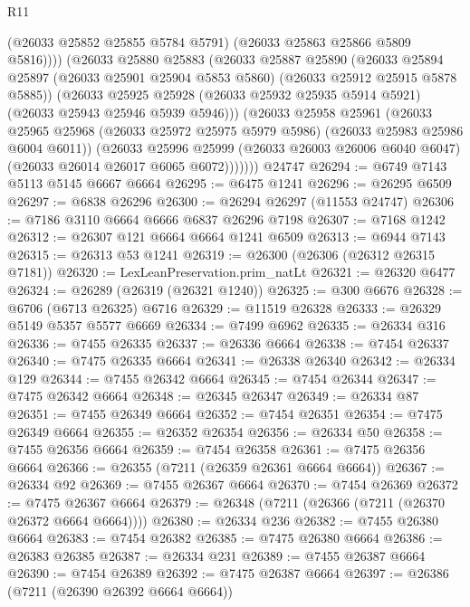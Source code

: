 \begin{lexlean}{R11}
\begin{coremodule}
{{{{{{{{{{{{{{{{{{{{{{{{{{{{{{{{{{{{{{{{{{{{{{{{{{{{{{{{{{{{{{{{{{{{{{{{{{{{{{{{{{                (@26033 @25852 @25855 @5784 @5791)
                (@26033 @25863 @25866 @5809 @5816))))
          (@26033
            @25880
            @25883
            (@26033
              @25887
              @25890
              (@26033
                @25894
                @25897
                (@26033 @25901 @25904 @5853 @5860)
                (@26033 @25912 @25915 @5878 @5885))
              (@26033
                @25925
                @25928
                (@26033 @25932 @25935 @5914 @5921)
                (@26033 @25943 @25946 @5939 @5946)))
            (@26033
              @25958
              @25961
              (@26033
                @25965
                @25968
                (@26033 @25972 @25975 @5979 @5986)
                (@26033 @25983 @25986 @6004 @6011))
              (@26033
                @25996
                @25999
                (@26033 @26003 @26006 @6040 @6047)
                (@26033 @26014 @26017 @6065 @6072)))))))
    @24747
@26294 := @6749 @7143 @5113 @5145 @6667 @6664
@26295 := @6475 @1241
@26296 := @26295 @6509
@26297 := @6838 @26296
@26300 := @26294 @26297 (@11553 @24747)
@26306 := @7186 @3110 @6664 @6666 @6837 @26296 @7198
@26307 := @7168 @1242
@26312 := @26307 @121 @6664 @6664 @1241 @6509
@26313 := @6944 @7143
@26315 := @26313 @53 @1241
@26319 := @26300 (@26306 (@26312 @26315 @7181))
@26320 := LexLeanPreservation.prim_natLt
@26321 := @26320 @6477
@26324 := @26289 (@26319 (@26321 @1240))
@26325 := @300 @6676
@26328 := @6706 (@6713 @26325) @6716
@26329 := @11519 @26328
@26333 := @26329 @5149 @5357 @5577 @6669
@26334 := @7499 @6962
@26335 := @26334 @316
@26336 := @7455 @26335
@26337 := @26336 @6664
@26338 := @7454 @26337
@26340 := @7475 @26335 @6664
@26341 := @26338 @26340
@26342 := @26334 @129
@26344 := @7455 @26342 @6664
@26345 := @7454 @26344
@26347 := @7475 @26342 @6664
@26348 := @26345 @26347
@26349 := @26334 @87
@26351 := @7455 @26349 @6664
@26352 := @7454 @26351
@26354 := @7475 @26349 @6664
@26355 := @26352 @26354
@26356 := @26334 @50
@26358 := @7455 @26356 @6664
@26359 := @7454 @26358
@26361 := @7475 @26356 @6664
@26366 := @26355 (@7211 (@26359 @26361 @6664 @6664))
@26367 := @26334 @92
@26369 := @7455 @26367 @6664
@26370 := @7454 @26369
@26372 := @7475 @26367 @6664
@26379 := @26348 (@7211 (@26366 (@7211 (@26370 @26372 @6664 @6664))))
@26380 := @26334 @236
@26382 := @7455 @26380 @6664
@26383 := @7454 @26382
@26385 := @7475 @26380 @6664
@26386 := @26383 @26385
@26387 := @26334 @231
@26389 := @7455 @26387 @6664
@26390 := @7454 @26389
@26392 := @7475 @26387 @6664
@26397 := @26386 (@7211 (@26390 @26392 @6664 @6664))
}}}}}}}}}}}}}}}}}}}}}}}}}}}}}}}}}}}}}}}}}}}}}}}}}}}}}}}}}}}}}}}}}}}}}}}}}}}}}}}}}}
\end{coremodule}
\end{lexlean}
